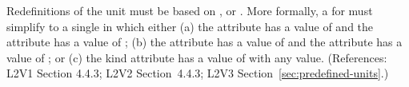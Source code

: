 Redefinitions of the  unit  must be
based on ,  or .  More
formally, a \UnitDefinition for  must simplify to a single
\Unit in which either (a) the  attribute has a value of
 and the  attribute has a value of ; (b)
the  attribute has a value of  and the
 attribute has a value of ; or (c) the kind
attribute has a value of  with any 
value.  (References: L2V1 Section 4.4.3; L2V2 Section~4.4.3; L2V3
Section~\ref{sec:predefined-units}.)

